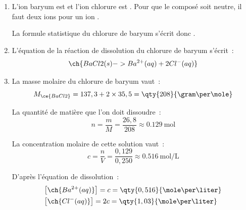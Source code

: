 \begin{enumerate}
    \item L'ion baryum est  et l'ion chlorure est . Pour
          que le composé soit neutre, il faut deux ions  pour un ion
          .
          
          La formule statistique du chlorure de baryum s'écrit donc
         .
    \item L'équation de la réaction de dissolution du chlorure de baryum
          s'écrit~:
          \[
              \ch{BaCl2(s) -> Ba^{2+}(aq) + 2 Cl^{-}(aq)}
          \]
    \item La masse molaire du chlorure de baryum vaut~:
          \[
              M_{\ce{BaCl2}}=137,3+2\times35,5=\qty{208}{\gram\per\mole}
          \]

          La quantité de matière que l'on doit dissoudre~:
          \[
              n=\frac{m}{M}=\frac{26,8}{208}\approx\qty{0,129}{\mole}
          \]

          La concentration molaire de cette solution vaut~:
          \[
              c=\frac{n}{V}=\frac{0,129}{0,250}\approx
              \qty{0,516}{\mole\per\liter}
          \]

          D'après l'équation de dissolution~:
          \begin{align*}
              & \bigl[\ch{Ba^{2+}(aq)}\bigr]=c=\qty{0,516}{\mole\per\liter} \\
              & \bigl[\ch{Cl^-(aq)}\bigr]=2c=\qty{1,03}{\mole\per\liter}
          \end{align*}
\end{enumerate}

